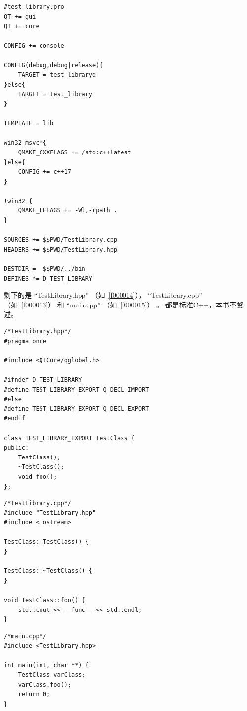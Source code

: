 \begin{lstlisting}[label=f000012,
caption=GoodLuck,
title=\lstlistingname\ \thelstlisting
]
#test_library.pro
QT += gui
QT += core

CONFIG += console

CONFIG(debug,debug|release){
    TARGET = test_libraryd
}else{
    TARGET = test_library
}

TEMPLATE = lib

win32-msvc*{
    QMAKE_CXXFLAGS += /std:c++latest
}else{
    CONFIG += c++17
}

!win32 {
    QMAKE_LFLAGS += -Wl,-rpath .
}

SOURCES += $$PWD/TestLibrary.cpp
HEADERS += $$PWD/TestLibrary.hpp

DESTDIR =  $$PWD/../bin
DEFINES *= D_TEST_LIBRARY
\end{lstlisting}          %


剩下的是
“TestLibrary.hpp”
（如\lstlistingname\ \ref{f000014}），
“TestLibrary.cpp”
（如\lstlistingname\ \ref{f000013}）
和
“main.cpp”
（如\lstlistingname\ \ref{f000015}）
。
都是标准C{\sourcefonttwo{}+}{\sourcefonttwo{}+}，本书不赘述。
\begin{lstlisting}[label=f000014,
caption=GoodLuck,
title=\lstlistingname\ \thelstlisting
]
/*TestLibrary.hpp*/
#pragma once

#include <QtCore/qglobal.h>

#ifndef D_TEST_LIBRARY
#define TEST_LIBRARY_EXPORT Q_DECL_IMPORT
#else
#define TEST_LIBRARY_EXPORT Q_DECL_EXPORT
#endif

class TEST_LIBRARY_EXPORT TestClass {
public:
    TestClass();
    ~TestClass();
    void foo();
};
\end{lstlisting}          %
\begin{lstlisting}[label=f000013,
caption=GoodLuck,
title=\lstlistingname\ \thelstlisting
]
/*TestLibrary.cpp*/
#include "TestLibrary.hpp"
#include <iostream>

TestClass::TestClass() {
}

TestClass::~TestClass() {
}

void TestClass::foo() {
    std::cout << __func__ << std::endl;
}
\end{lstlisting}          %
\begin{lstlisting}[label=f000015,
caption=GoodLuck,
title=\lstlistingname\ \thelstlisting
]
/*main.cpp*/
#include <TestLibrary.hpp>

int main(int, char **) {
    TestClass varClass;
    varClass.foo();
    return 0;
}
\end{lstlisting}          %


